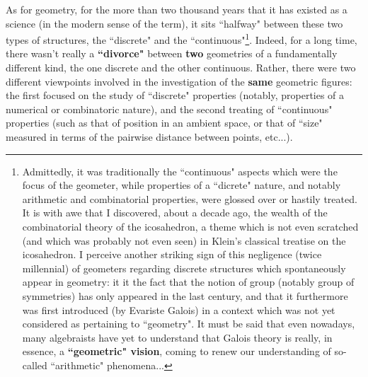 As for geometry, for the more than two thousand years that it has existed as a science (in the modern sense of the term), it sits ``halfway" between these two types of structures, the ``discrete" and the ``continuous"\footnote{Admittedly, it was traditionally the ``continuous" aspects which were the focus of the geometer, while properties of a ``dicrete" nature, and notably arithmetic and combinatorial properties, were glossed over or hastily treated. It is with awe that I discovered, about a decade ago, the wealth of the combinatorial theory of the icosahedron, a theme which is not even scratched (and which was probably not even seen) in Klein's classical treatise on the icosahedron. I perceive another striking sign of this negligence (twice millennial) of geometers regarding discrete structures which spontaneously appear in geometry: it it the fact that the notion of group (notably group of symmetries) has only appeared in the last century, and that it furthermore was first introduced (by Evariste Galois) in a context which was not yet considered as pertaining to ``geometry". It must be said that even nowadays, many algebraists have yet to understand that Galois theory is really, in essence, a \textbf{``geometric" vision}, coming to renew our understanding of so-called ``arithmetic" phenomena...}. Indeed, for a long time, there wasn't really a \textbf{``divorce"} between \textbf{two} geometries of a fundamentally different kind, the one discrete and the other continuous. Rather, there were two different viewpoints involved in the investigation of the \textbf{same} geometric figures: the first focused on the study of ``discrete" properties (notably, properties of a numerical or combinatoric nature), and the second treating of ``continuous" properties (such as that of position in an ambient space, or that of ``size" measured in terms of the pairwise distance between points, etc...).

